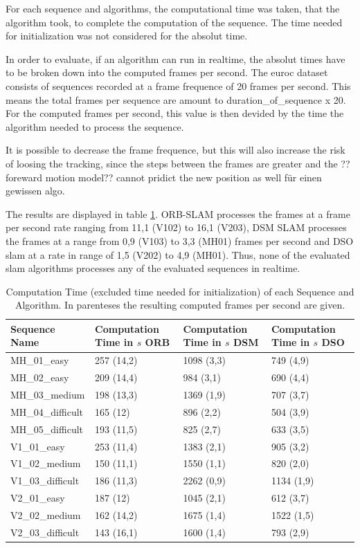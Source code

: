	For each sequence and algorithms, the computational time was taken, that the algorithm took, to complete the computation of the sequence. 
	The time needed for initialization was not considered for the absolut time. 
	
	In order to evaluate, if an algorithm can run in realtime, the absolut times have to be broken down into the computed frames per second.
	The euroc dataset consists of sequences recorded at a frame frequence of 20 frames per second. This means the total frames per sequence 
	are amount to duration\_of\_sequence x 20. For the computed frames per second, this value is then devided by the time the algorithm needed 
	to process the sequence. 
	
	It is possible to decrease the frame 
	frequence, but this will also increase the risk of loosing the tracking, since the steps between the frames are greater and 
	the ??foreward motion model?? cannot pridict the new position as well für einen gewissen algo. %
	
	The results are displayed in table \ref{table:comp_time}. ORB-SLAM processes the frames at a frame per second rate ranging from 11,1 (V102) to 16,1 (V203), 
	DSM SLAM processes the frames at a range from 0,9 (V103) to 3,3 (MH01) frames per second and DSO slam at a rate in range of 1,5 (V202) to 4,9 (MH01). Thus, 
	none of the evaluated slam algorithms processes any of the evaluated sequences in realtime. 
	

	\begin{table}
	\caption{Computation Time (excluded time needed for initialization) of each Sequence and Algorithm. In parenteses the 
	resulting computed frames per second are given.}
	\begin{tabular}{ |p{3cm}||p{3cm}|p{3cm}|p{3cm}|  }
	\hline
	Sequence Name & Computation Time in $s$ ORB & Computation Time in $s$ DSM & Computation Time in $s$ DSO \\
	\hline
	MH\_01\_easy & 257 (14,2) & 1098 (3,3) & 749 (4,9)\\
	MH\_02\_easy & 209 (14,4) & 984 (3,1) & 690 (4,4)\\
	MH\_03\_medium & 198 (13,3) & 1369 (1,9) & 707 (3,7)\\
	MH\_04\_difficult & 165 (12) & 896 (2,2) & 504 (3,9)\\
	MH\_05\_difficult & 193 (11,5) & 825 (2,7) & 633 (3,5)\\
	V1\_01\_easy & 253 (11,4) & 1383 (2,1) & 905 (3,2)\\
	V1\_02\_medium & 150 (11,1) & 1550 (1,1) & 820 (2,0)\\
	V1\_03\_difficult & 186 (11,3) & 2262 (0,9) & 1134 (1,9)\\
	V2\_01\_easy & 187 (12) & 1045 (2,1) & 612 (3,7)\\
	V2\_02\_medium & 162 (14,2) & 1675 (1,4) & 1522 (1,5)\\
	V2\_03\_difficult & 143 (16,1) & 1600 (1,4) & 793 (2,9)\\
	\hline
	\end{tabular}
	\label{table:comp_time}
	\end{table}


